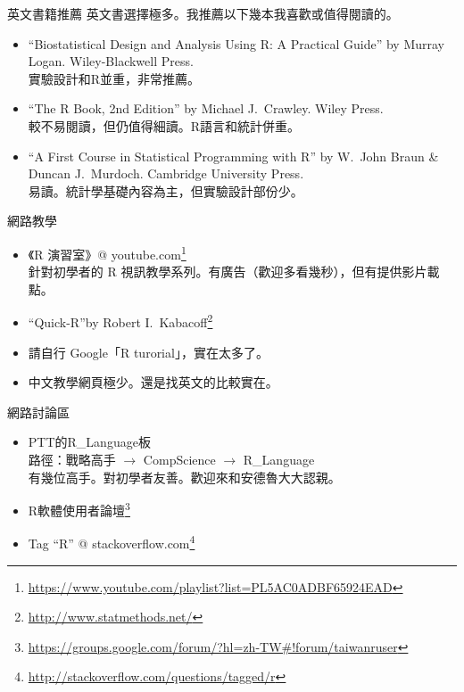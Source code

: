 \documentclass[14pt, aspectratio=43]{beamer}
\let\oldfootnote\footnote
\renewcommand\footnote[1]{\hspace{-0.7em}\oldfootnote{\ignorespaces#1}\hspace{0.5em}}
\begin{document}
\begin{frame}{英文書籍推薦}
英文書選擇極多。我推薦以下幾本我喜歡或值得閱讀的。
\begin{itemize}
\item ``Biostatistical Design and Analysis Using R: A Practical Guide'' by Murray Logan. Wiley-Blackwell Press.\\ 實驗設計和R並重，非常推薦。
\item ``The R Book, 2nd Edition'' by Michael J.~Crawley. Wiley Press. \\ 較不易閱讀，但仍值得細讀。R語言和統計併重。
\item ``A First Course in Statistical Programming with R'' by W.~John Braun \& Duncan J.~Murdoch. Cambridge University Press. \\ 易讀。統計學基礎內容為主，但實驗設計部份少。
\end{itemize}
\end{frame}


\begin{frame}{網路教學}
\begin{itemize}
\item 《R 演習室》\makeatletter @ \makeatother youtube.com\oldfootnote{\url{https://www.youtube.com/playlist?list=PL5AC0ADBF65924EAD}} \\ 針對初學者的 R 視訊教學系列。有廣告（歡迎多看幾秒），但有提供影片載點。
\item ``Quick-R''by Robert I.~Kabacoff\oldfootnote{\url{http://www.statmethods.net/}}
\item 請自行 Google「R turorial」，實在太多了。
\item 中文教學網頁極少。還是找英文的比較實在。
\end{itemize}
\end{frame}


\begin{frame}{網路討論區}
\begin{itemize}
\item PTT的R\_Language板 \\ 路徑：戰略高手 $\rightarrow$ CompScience $\rightarrow$ R\_Language\\ 有幾位高手。對初學者友善。歡迎來和安德魯大大認親。
\item R軟體使用者論壇\oldfootnote{\url{https://groups.google.com/forum/?hl=zh-TW\#!forum/taiwanruser}}
\item Tag ``R''  \makeatletter @ \makeatother stackoverflow.com\oldfootnote{\url{http://stackoverflow.com/questions/tagged/r}}
\end{itemize}
\end{frame}
\end{document}
